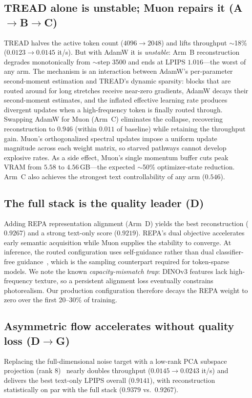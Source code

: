 \documentclass[10pt,twocolumn]{article}
\begin{document}
\subsection{TREAD alone is unstable; Muon repairs it (A$\to$B$\to$C)}
TREAD halves the active token count ($4096\to2048$) and lifts throughput
$\sim$18\% ($0.0123\to0.0145$ it/s). But with AdamW it is \emph{unstable}: Arm~B
reconstruction degrades monotonically from $\sim$step 3500 and ends at LPIPS
$1.016$---the worst of any arm. The mechanism is an interaction between AdamW's
per-parameter second-moment estimation and TREAD's dynamic sparsity: blocks that
are routed around for long stretches receive near-zero gradients, AdamW decays
their second-moment estimates, and the inflated effective learning rate produces
divergent updates when a high-frequency token is finally routed through.
Swapping AdamW for Muon (Arm~C) eliminates the collapse, recovering
reconstruction to $0.946$ (within $0.011$ of baseline) while retaining the
throughput gain. Muon's orthogonalized spectral updates impose a uniform update
magnitude across each weight matrix, so starved pathways cannot develop
explosive rates. As a side effect, Muon's single momentum buffer cuts peak VRAM
from $5.58$ to $4.56$\,GB---the expected $\sim$50\% optimizer-state reduction.
Arm~C also achieves the strongest text controllability of any arm
($0.546$).

\subsection{The full stack is the quality leader (D)}
Adding REPA representation alignment (Arm~D) yields the best reconstruction
($0.9267$) and a strong text-only score ($0.9219$). REPA's dual objective
accelerates early semantic acquisition while Muon supplies the stability to
converge. At inference, the routed configuration uses self-guidance rather than
dual classifier-free guidance~\citep{krause2025selfguidance}, which is the
sampling counterpart required for token-sparse models. We note the known \emph{capacity-mismatch trap}: DINOv3 features lack
high-frequency texture, so a persistent alignment loss eventually constrains
photorealism. Our production configuration therefore decays the REPA weight to
zero over the first 20--30\% of training.

\subsection{Asymmetric flow accelerates without quality loss (D$\to$G)}
Replacing the full-dimensional noise target with a low-rank PCA subspace
projection (rank 8)~\citep{asymflow2026} nearly doubles throughput ($0.0145\to0.0243$ it/s) and
delivers the best text-only LPIPS overall ($0.9141$), with reconstruction
statistically on par with the full stack ($0.9379$ vs.\ $0.9267$).
\end{document}
